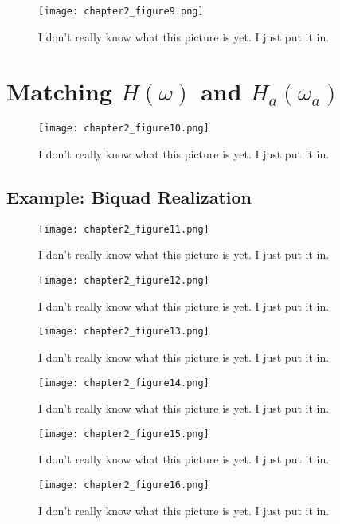 \documentclass[11pt,fleqn]{book} %
\begin{document}
\begin{enumerate}
\begin{figure}[h]
  \centering\texttt{[image: chapter2\_figure9.png]}
  \caption{I don't really know what this picture is yet. I just put it in.}
\end{figure}

\section{Matching $H(\omega)$ and $H_a(\omega_a)$}

\begin{figure}[h]
  \centering\texttt{[image: chapter2\_figure10.png]}
  \caption{I don't really know what this picture is yet. I just put it in.}
\end{figure}

\subsection{Example: Biquad Realization}

\begin{figure}[h]
  \centering\texttt{[image: chapter2\_figure11.png]}
  \caption{I don't really know what this picture is yet. I just put it in.}
\end{figure}

\begin{figure}[h]
  \centering\texttt{[image: chapter2\_figure12.png]}
  \caption{I don't really know what this picture is yet. I just put it in.}
\end{figure}
\begin{figure}[h]
  \centering\texttt{[image: chapter2\_figure13.png]}
  \caption{I don't really know what this picture is yet. I just put it in.}
\end{figure}
\begin{figure}[h]
  \centering\texttt{[image: chapter2\_figure14.png]}
  \caption{I don't really know what this picture is yet. I just put it in.}
\end{figure}
\begin{figure}[h]
  \centering\texttt{[image: chapter2\_figure15.png]}
  \caption{I don't really know what this picture is yet. I just put it in.}
\end{figure}
\begin{figure}[h]
  \centering\texttt{[image: chapter2\_figure16.png]}
  \caption{I don't really know what this picture is yet. I just put it in.}
\end{figure}


\end{enumerate}
\end{document}
